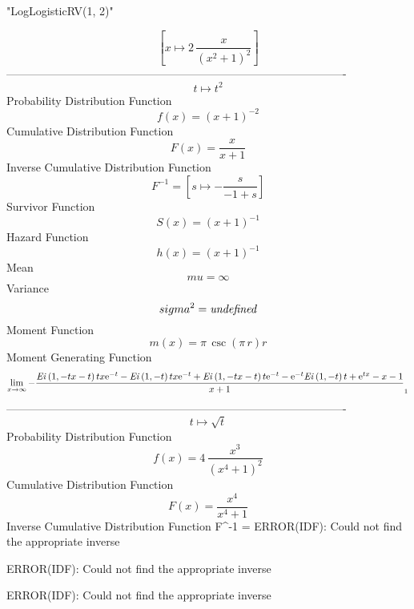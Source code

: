 \documentclass[12pt]{article}
\begin{document}
 
                            "LogLogisticRV(1, 2)"

$$[x\mapsto 2\,{\frac {x}{ \left( {x}^{2}+1 \right) ^{2}}}]
$$-------------------------------------------------------------------------------------------  \\$$t\mapsto {t}^{2}
$$Probability Distribution Function 
$$  f(x)= \left( x+1 \right) ^{-2}
$$Cumulative Distribution Function  
 $$F(x)={\frac {x}{x+1}}
$$ Inverse Cumulative Distribution Function 
  $$F^{-1} = [s\mapsto -{\frac {s}{-1+s}}]
$$Survivor Function 
 $$ S(x)= \left( x+1 \right) ^{-1}
$$ Hazard Function 
 $$ h(x)= \left( x+1 \right) ^{-1}
$$Mean 
 $$ mu=\infty 
$$ Variance 
 $$ sigma^2 = {\it undefined}
$$Moment Function 
 $$ m(x) = \pi\,\csc \left( \pi\,r \right) r
$$ Moment Generating Function 
 $$\lim _{x\rightarrow \infty }-{\frac {{\it Ei} \left( 1,-tx-t \right) t
x{{\rm e}^{-t}}-{\it Ei} \left( 1,-t \right) tx{{\rm e}^{-t}}+{\it Ei}
 \left( 1,-tx-t \right) t{{\rm e}^{-t}}-{{\rm e}^{-t}}{\it Ei} \left( 
1,-t \right) t+{{\rm e}^{tx}}-x-1}{x+1}}_{{1}}
$$-------------------------------------------------------------------------------------------  \\$$t\mapsto \sqrt {t}
$$Probability Distribution Function 
$$  f(x)=4\,{\frac {{x}^{3}}{ \left( {x}^{4}+1 \right) ^{2}}}
$$Cumulative Distribution Function  
 $$F(x)={\frac {{x}^{4}}{{x}^{4}+1}}
$$ Inverse Cumulative Distribution Function 
  $$F^{-1} =              ERROR(IDF): Could not find the appropriate inverse

             ERROR(IDF): Could not find the appropriate inverse

             ERROR(IDF): Could not find the appropriate inverse
\end{document}
